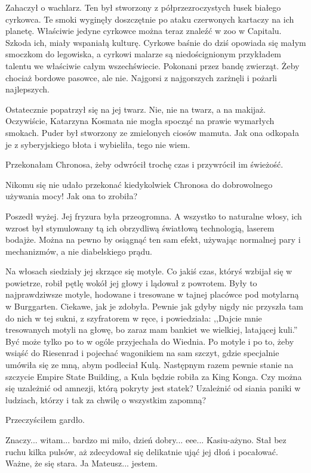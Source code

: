 Zahaczył o wachlarz.
Ten był stworzony z półprzezroczystych łusek białego cyrkowca.
Te smoki wyginęły doszczętnie po ataku czerwonych kartaczy na ich planetę.
Właściwie jedyne cyrkowce można teraz znaleźć w zoo w Capitalu.
Szkoda ich, miały wspaniałą kulturę. 
Cyrkowe baśnie do dziś opowiada się małym smoczkom do legowiska, a cyrkowi malarze są niedoścignionym przykładem talentu we właściwie całym wszechświecie.
Pokonani przez bandę zwierząt. Żeby chociaż bordowe pasowce, ale nie. Najgorsi z najgorszych zarżnęli i pożarli najlepszych.

Ostatecznie popatrzył się na jej twarz.
Nie, nie na twarz, a na makijaż.
Oczywiście, Katarzyna Kosmata nie mogła spocząć na prawie wymarłych smokach.
Puder był stworzony ze zmielonych ciosów mamuta.
Jak ona odkopała je z syberyjskiego błota i wybieliła, tego nie wiem.

\ds{} Przekonałam Chronosa, żeby odwrócił trochę czas i przywrócił im świeżość. \de{}

Nikomu się nie udało przekonać kiedykolwiek Chronosa do dobrowolnego używania mocy! Jak ona to zrobiła?

Poszedł wyżej.
Jej fryzura była przeogromna. A wszystko to naturalne włosy, ich wzrost był stymulowany tą ich obrzydliwą światłową technologią, laserem bodajże.
Można na pewno by osiągnąć ten sam efekt, używając normalnej pary i mechanizmów, a nie diabelskiego prądu.

Na włosach siedziały jej skrzące się motyle. Co jakiś czas, któryś wzbijał się w powietrze, robił pętlę wokół jej głowy i lądował z powrotem.
Były to najprawdziwsze motyle, hodowane i tresowane w tajnej placówce pod motylarną w Burggarten.
Ciekawe, jak je zdobyła. Pewnie jak gdyby nigdy nic przyszła tam do nich w tej sukni, z szyfratorem w ręce, i powiedziała:
,,Dajcie mnie tresowanych motyli na głowę, bo zaraz mam bankiet we wielkiej, latającej kuli.''
Być może tylko po to w ogóle przyjechała do Wiednia.
Po motyle i po to, żeby wsiąść do Riesenrad i pojechać wagonikiem na sam szczyt, gdzie specjalnie umówiła się ze mną, abym podleciał Kulą.
Następnym razem pewnie stanie na szczycie Empire State Building, a Kula będzie robiła za King Konga.
Czy można się uzależnić od amnezji, którą pokryty jest statek? 
Uzależnić od siania paniki w ludziach, którzy i tak za chwilę o wszystkim zapomną?

Przeczyściłem gardło.

\ds{} Znaczy... witam... bardzo mi miło, dzień dobry... eee... Kasiu-ażyno. \dm{} Stał bez ruchu kilka pulsów, aż zdecydował się delikatnie ująć jej dłoń i pocałować. 
Ważne, że się stara. \dm{} Ja Mateusz... jestem. \de{}

